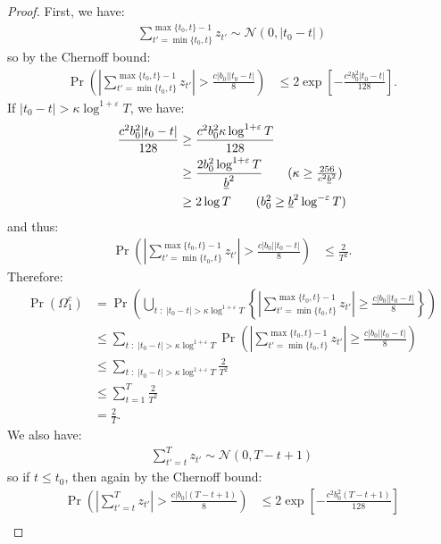 \begin{proof}

First, we have:
\begin{align*}
    \sum_{t'=\min\{t_0,t\}}^{\max\{t_0,t\}-1} z_{t'} \sim \mathcal{N}(0,|t_0-t|)
\end{align*}
so by the Chernoff bound: 
\begin{align*}
    \Pr\left(\left|\sum_{t'=\min\{t_0,t\}}^{\max\{t_0,t\}-1} z_{t'} \right| > \frac{c|b_0||t_0-t|}{8}\right) &\leq 2 \exp\left[- \frac{c^2b_0^2|t_0-t|}{128}\right]. 
\end{align*}
If $|t_0-t| > \kappa \log^{1+\varepsilon}T$, we have:
\begin{align*}
    \frac{c^2b_0^2|t_0-t|}{128} &\geq \frac{c^2b_0^2 \kappa \log^{1+\varepsilon}T}{128} \\
    &\geq \frac{2 b_0^2 \log^{1+\varepsilon}T}{\underline{b}^2} \tag{$\kappa \geq \frac{256}{c^2 \underline{b}^2}$} \\
    &\geq 2 \log T \tag{$b_0^2 \geq \underline{b}^2\log^{-\varepsilon}T$}
\end{align*}
and thus:
\begin{align*}
    \Pr\left(\left|\sum_{t'=\min\{t_0,t\}}^{\max\{t_0,t\}-1} z_{t'} \right| > \frac{c|b_0||t_0-t|}{8}\right) &\leq \frac{2}{T^2}. 
\end{align*}
Therefore:
\begin{align*}
    \Pr(\Omega^c_1) &= \Pr\left(\bigcup_{t \;:\; |t_0 - t| > \kappa \log^{1+\varepsilon}T} \left\{\left|\sum_{t'=\min\{t_0,t\}}^{\max\{t_0,t\}-1} z_{t'}\right| \geq \frac{c|b_0||t_0-t|}{8}\right\} \right) \\
    &\leq \sum_{t \;:\; |t_0 - t| > \kappa \log^{1+\varepsilon}T} \Pr\left(\left|\sum_{t'=\min\{t_0,t\}}^{\max\{t_0,t\}-1} z_{t'}\right| \geq \frac{c|b_0||t_0-t|}{8} \right)\tag{union bound} \\
    &\leq \sum_{t \;:\; |t_0 - t| > \kappa \log^{1+\varepsilon}T} \frac{2}{T^2} \\
    &\leq \sum_{t=1}^T \frac{2}{T^2} \\
    &= \frac{2}{T}.
\end{align*}
We also have:
\begin{align*}
    \sum_{t'=t}^T z_{t'} \sim \mathcal{N}(0,T-t+1) 
\end{align*}
so if $t \leq t_0$, then again by the Chernoff bound:
\begin{align*}
    \Pr\left(\left|\sum_{t'=t}^T z_{t'} \right| > \frac{c|b_0|(T-t+1)}{8}\right) &\leq 2 \exp\left[- \frac{c^2b_0^2(T-t+1)}{128}\right] \\

\end{align*}
\end{proof}
